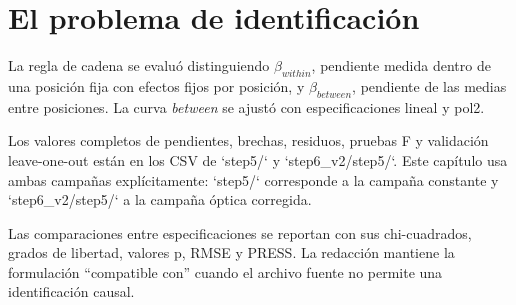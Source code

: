 \chapter{El problema de identificación}
La regla de cadena se evaluó distinguiendo $\beta_{within}$, pendiente medida dentro de una posición fija con efectos fijos por posición, y $\beta_{between}$, pendiente de las medias entre posiciones. La curva \emph{between} se ajustó con especificaciones lineal y pol2.

Los valores completos de pendientes, brechas, residuos, pruebas F y validación leave-one-out están en los CSV de `step5/` y `step6\_v2/step5/`. Este capítulo usa ambas campañas explícitamente: `step5/` corresponde a la campaña constante y `step6\_v2/step5/` a la campaña óptica corregida.

Las comparaciones entre especificaciones se reportan con sus chi-cuadrados, grados de libertad, valores p, RMSE y PRESS. La redacción mantiene la formulación ``compatible con'' cuando el archivo fuente no permite una identificación causal.
